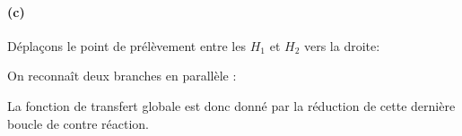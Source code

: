 \paragraph{(c)}
\begin{center}
    
\end{center}
Déplaçons le point de prélèvement entre les $H_1$ et $H_2$ vers la droite:
\begin{center}
    
\end{center}
On reconnaît deux branches en parallèle :
\begin{center}
    
\end{center}
La fonction de transfert globale est donc donné par la réduction de cette 
dernière boucle de contre réaction.
\begin{center}
    
\end{center}
